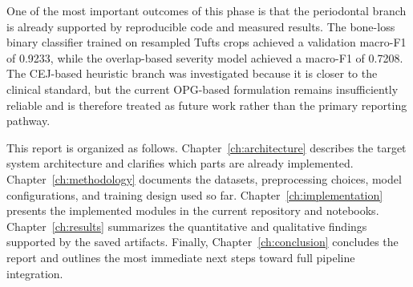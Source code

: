 One of the most important outcomes of this phase is that the periodontal branch
is already supported by reproducible code and measured results. The bone-loss
binary classifier trained on resampled Tufts crops achieved a validation
macro-F1 of 0.9233, while the overlap-based severity model achieved a macro-F1
of 0.7208. The CEJ-based heuristic branch was investigated because it is closer
to the clinical standard, but the current OPG-based formulation remains
insufficiently reliable and is therefore treated as future work rather than the
primary reporting pathway.

This report is organized as follows. Chapter~\ref{ch:architecture} describes
the target system architecture and clarifies which parts are already
implemented. Chapter~\ref{ch:methodology} documents the datasets, preprocessing
choices, model configurations, and training design used so far.
Chapter~\ref{ch:implementation} presents the implemented modules in the current
repository and notebooks. Chapter~\ref{ch:results} summarizes the quantitative
and qualitative findings supported by the saved artifacts. Finally,
Chapter~\ref{ch:conclusion} concludes the report and outlines the most
immediate next steps toward full pipeline integration.
